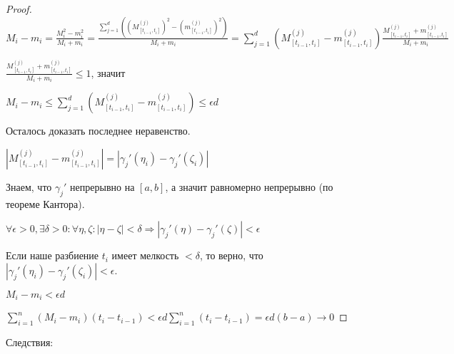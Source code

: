 \begin{proof}
        $M_i - m_i = \frac{M_i^2 - m_i^2}{M_i + m_i} = 
        \frac{\sum\limits_{j = 1}^d ((M_{[t_{i - 1}, t_{i}]}^{(j)})^2 - (m_{[t_{i - 1}, t_{i}]}^{(j)})^2)}{M_i + m_i} = 
        \sum\limits_{j = 1}^d (M_{[t_{i - 1}, t_{i}]}^{(j)} - m_{[t_{i - 1}, t_{i}]}^{(j)}) 
        \frac{M_{[t_{i - 1}, t_{i}]}^{(j)} + m_{[t_{i - 1}, t_{i}]}^{(j)}}{M_i + m_i}$

        $\frac{M_{[t_{i - 1}, t_{i}]}^{(j)} + m_{[t_{i - 1}, t_{i}]}^{(j)}}{M_i + m_i} \le 1$, значит

        $M_i - m_i \le \sum\limits_{j = 1}^d (M_{[t_{i - 1}, t_{i}]}^{(j)} - m_{[t_{i - 1}, t_{i}]}^{(j)}) \le \epsilon d$

        Осталось доказать последнее неравенство.

        $|M_{[t_{i - 1}, t_{i}]}^{(j)} - m_{[t_{i - 1}, t_{i}]}^{(j)}| = |\gamma_j'(\eta_i) - \gamma_j'(\zeta_i)|$

        Знаем, что $\gamma_j'$ непрерывно на $[a, b]$, а значит равномерно непрерывно (по теореме Кантора).

        $\forall \epsilon > 0, \exists \delta > 0: \forall \eta, \zeta \colon |\eta - \zeta| < \delta \Rightarrow |\gamma_j'(\eta) - \gamma_j'(\zeta)| < \epsilon$

        Если наше разбиение ${t_i}$ имеет мелкость $< \delta$, то верно, что $|\gamma_j'(\eta_i) - \gamma_j'(\zeta_i)| < \epsilon$.

        $M_i - m_i < \epsilon d$

        $\sum\limits_{i = 1}^n (M_i - m_i)(t_i - t_{i - 1}) < \epsilon d \sum\limits_{i = 1}^n (t_i - t_{i - 1}) = \epsilon d (b - a) \rightarrow 0$

    \end{proof}

    Следствия:

